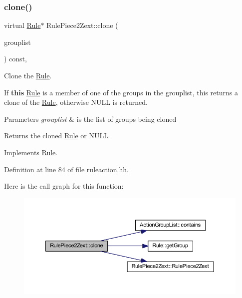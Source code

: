 \subsubsection{\texorpdfstring{clone()}{clone()}}
{\footnotesize\ttfamily virtual \mbox{\hyperlink{class_rule}{Rule}}$\ast$ Rule\+Piece2\+Zext\+::clone (\begin{DoxyParamCaption}\item[{const \mbox{\hyperlink{class_action_group_list}{Action\+Group\+List}} \&}]{grouplist }\end{DoxyParamCaption}) const\hspace{0.3cm}{\ttfamily [inline]}, {\ttfamily [virtual]}}



Clone the \mbox{\hyperlink{class_rule}{Rule}}. 

If {\bfseries{this}} \mbox{\hyperlink{class_rule}{Rule}} is a member of one of the groups in the grouplist, this returns a clone of the \mbox{\hyperlink{class_rule}{Rule}}, otherwise N\+U\+LL is returned. 
\begin{DoxyParams}{Parameters}
{\em grouplist} & is the list of groups being cloned \\
\hline
\end{DoxyParams}
\begin{DoxyReturn}{Returns}
the cloned \mbox{\hyperlink{class_rule}{Rule}} or N\+U\+LL 
\end{DoxyReturn}


Implements \mbox{\hyperlink{class_rule_a70de90a76461bfa7ea0b575ce3c11e4d}{Rule}}.



Definition at line 84 of file ruleaction.\+hh.

Here is the call graph for this function\+:
\nopagebreak
\begin{figure}[H]
\begin{center}
\leavevmode
\includegraphics[width=350pt]{class_rule_piece2_zext_ad383e6fe63af0ef65f4c9d5204e39dd5_cgraph}
\end{center}
\end{figure}
\mbox{\label{class_rule_piece2_zext_a10fb5ff85b1f1397eb17dc6c6fc47133}} 
